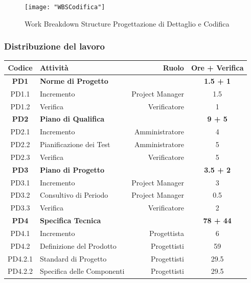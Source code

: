 \documentclass[12pt,a4paper,titlepage]{article}
\begin{document}
	\begin{figure}[p]
		\centering
		\texttt{[image: "WBSCodifica"]}
		\caption{Work Breakdown Structure Progettazione di Dettaglio e Codifica}
		\label{fig:WBSCodifica}
	\end{figure}

	\subsubsection{Distribuzione del lavoro}{
		\small
		{\renewcommand\arraystretch{1.1} %
			\begin{tabular}{|c|l|r|c|}
				\hline
				{\textbf{Codice}}&{\textbf{Attività}}&{\textbf{Ruolo}}&{\textbf{Ore + Verifica}}\\
				\hline
				\textbf{PD1} & \textbf{Norme di Progetto} & & \textbf{1.5 + 1} \\
				
				PD1.1 & Incremento & Project Manager & 1.5 \\
				
				PD1.2 &	Verifica & Verificatore & 1 \\
				\hline
				\textbf{PD2} & \textbf{Piano di Qualifica} & & \textbf{9 + 5} \\
				
				PD2.1 & Incremento & Amministratore & 4 \\
				
				PD2.2 & Pianificazione dei Test & Amministratore & 5 \\
				
				PD2.3 & Verifica & Verificatore & 5 \\
				\hline
				\textbf{PD3} & \textbf{Piano di Progetto} & & \textbf{3.5 + 2} \\
				
				PD3.1 & Incremento & Project Manager & 3 \\
				
				PD3.2 & Consultivo di Periodo & Project Manager & 0.5 \\
				
				PD3.3 & Verifica & Verificatore & 2 \\
				\hline
				\textbf{PD4} & \textbf{Specifica Tecnica} & & \textbf{78 + 44} \\
				
				PD4.1 & Incremento & Progettista & 6 \\
				
				PD4.2 & Definizione del Prodotto & Progettisti & 59 \\
				PD4.2.1 & Standard di Progetto & Progettisti & 29.5 \\
				PD4.2.2 & Specifica delle Componenti & Progettisti & 29.5 \\
				

\end{tabular}}}
\end{document}
